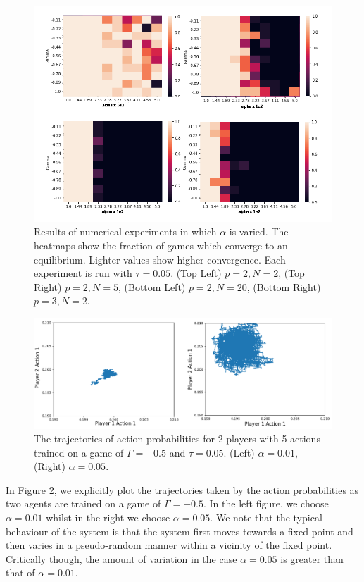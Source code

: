 \documentclass[sigconf,anonymous]{aamas}
\begin{document}
\begin{figure}[t]
    \includegraphics[width = 1.2 \linewidth, center]{Figures/Experiments.png}
    \caption{Results of numerical experiments in which $\alpha$ is varied. The heatmaps show the fraction of games which converge to an equilibrium. Lighter values show higher convergence. Each experiment is run with $\tau = 0.05$. (Top Left) $p = 2, N = 2$, (Top Right) $p = 2, N = 5$, (Bottom Left) $p = 2, N = 20$, (Bottom Right) $p=3, N = 2$.}
    \label{fig:NumericalExperiments}
\end{figure}

\begin{figure}[t]
    \includegraphics[width =  \linewidth, center]{Figures/alphavar5e2.png}
    \caption{The trajectories of action probabilities for 2 players with 5 actions trained on a game of $\Gamma = -0.5$ and $\tau = 0.05$. (Left) $\alpha = 0.01$, (Right) $\alpha = 0.05$.}
    \label{fig:AlphaVariation}
\end{figure}

In Figure \ref{fig:AlphaVariation}, we explicitly plot the trajectories taken by the action probabilities as two agents are trained on a game of $\Gamma = -0.5$. In the left figure, we choose $\alpha = 0.01$ whilst in the right we choose $\alpha = 0.05$. We note that the typical behaviour of the system is that the system first moves towards a fixed point and then varies in a pseudo-random manner within a vicinity of the fixed point. Critically though, the amount of variation in the case $\alpha = 0.05$ is greater than that of $\alpha = 0.01$. 
\end{document}
